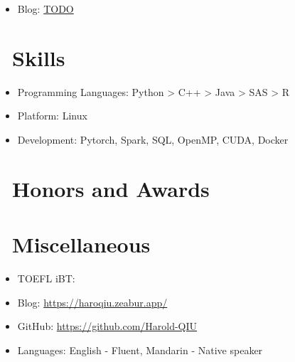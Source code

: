 \documentclass{resume}
\begin{document}
\begin{itemize}
    \item Blog: \href{TODO}{TODO}
\end{itemize}


\section{\faCogs\ Skills}
\begin{itemize}[parsep=0.5ex]
  \item Programming Languages: Python > C++ > Java > SAS > R
  \item Platform: Linux
  \item Development: Pytorch, Spark, SQL, OpenMP, CUDA, Docker
\end{itemize}

\section{\faHeartO\ Honors and Awards}

\section{\faInfo\ Miscellaneous}
\begin{itemize}[parsep=0.5ex]
  \item TOEFL iBT:
  \item Blog: \href{https://haroqiu.zeabur.app/}{https://haroqiu.zeabur.app/}
  \item GitHub: \href{https://github.com/Harold-QIU}{https://github.com/Harold-QIU}
  \item Languages: English - Fluent, Mandarin - Native speaker
\end{itemize}

%
%
\end{document}
